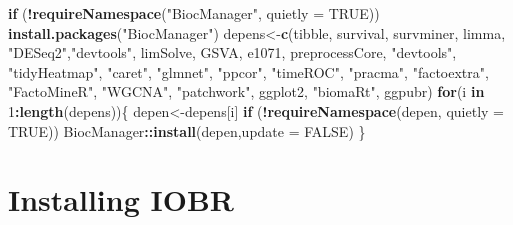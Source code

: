 \documentclass[
  12pt,
]{book}
\newenvironment{Shaded}{\begin{snugshade}}{\end{snugshade}}
\newcommand{\AttributeTok}[1]{\textcolor[rgb]{0.13,0.29,0.53}{#1}}
\newcommand{\ConstantTok}[1]{\textcolor[rgb]{0.56,0.35,0.01}{#1}}
\newcommand{\ControlFlowTok}[1]{\textcolor[rgb]{0.13,0.29,0.53}{\textbf{#1}}}
\newcommand{\DecValTok}[1]{\textcolor[rgb]{0.00,0.00,0.81}{#1}}
\newcommand{\FunctionTok}[1]{\textcolor[rgb]{0.13,0.29,0.53}{\textbf{#1}}}
\newcommand{\NormalTok}[1]{#1}
\newcommand{\OtherTok}[1]{\textcolor[rgb]{0.56,0.35,0.01}{#1}}
\newcommand{\SpecialCharTok}[1]{\textcolor[rgb]{0.81,0.36,0.00}{\textbf{#1}}}
\newcommand{\StringTok}[1]{\textcolor[rgb]{0.31,0.60,0.02}{#1}}
\theoremstyle{definition}
\theoremstyle{definition}
\theoremstyle{definition}
\theoremstyle{definition}
\theoremstyle{remark}
\begin{document}
\begin{Shaded}
\begin{Highlighting}[]
\ControlFlowTok{if}\NormalTok{ (}\SpecialCharTok{!}\FunctionTok{requireNamespace}\NormalTok{(}\StringTok{"BiocManager"}\NormalTok{, }\AttributeTok{quietly =} \ConstantTok{TRUE}\NormalTok{)) }\FunctionTok{install.packages}\NormalTok{(}\StringTok{"BiocManager"}\NormalTok{)}
\NormalTok{depens}\OtherTok{\textless{}{-}}\FunctionTok{c}\NormalTok{(}\StringTok{\textquotesingle{}tibble\textquotesingle{}}\NormalTok{, }\StringTok{\textquotesingle{}survival\textquotesingle{}}\NormalTok{, }\StringTok{\textquotesingle{}survminer\textquotesingle{}}\NormalTok{, }\StringTok{\textquotesingle{}limma\textquotesingle{}}\NormalTok{, }\StringTok{"DESeq2"}\NormalTok{,}\StringTok{"devtools"}\NormalTok{, }\StringTok{\textquotesingle{}limSolve\textquotesingle{}}\NormalTok{, }\StringTok{\textquotesingle{}GSVA\textquotesingle{}}\NormalTok{, }\StringTok{\textquotesingle{}e1071\textquotesingle{}}\NormalTok{, }\StringTok{\textquotesingle{}preprocessCore\textquotesingle{}}\NormalTok{, }
          \StringTok{"devtools"}\NormalTok{, }\StringTok{"tidyHeatmap"}\NormalTok{, }\StringTok{"caret"}\NormalTok{, }\StringTok{"glmnet"}\NormalTok{, }\StringTok{"ppcor"}\NormalTok{,  }\StringTok{"timeROC"}\NormalTok{, }\StringTok{"pracma"}\NormalTok{, }\StringTok{"factoextra"}\NormalTok{, }
          \StringTok{"FactoMineR"}\NormalTok{, }\StringTok{"WGCNA"}\NormalTok{, }\StringTok{"patchwork"}\NormalTok{, }\StringTok{\textquotesingle{}ggplot2\textquotesingle{}}\NormalTok{, }\StringTok{"biomaRt"}\NormalTok{, }\StringTok{\textquotesingle{}ggpubr\textquotesingle{}}\NormalTok{)}
\ControlFlowTok{for}\NormalTok{(i }\ControlFlowTok{in} \DecValTok{1}\SpecialCharTok{:}\FunctionTok{length}\NormalTok{(depens))\{}
\NormalTok{  depen}\OtherTok{\textless{}{-}}\NormalTok{depens[i]}
  \ControlFlowTok{if}\NormalTok{ (}\SpecialCharTok{!}\FunctionTok{requireNamespace}\NormalTok{(depen, }\AttributeTok{quietly =} \ConstantTok{TRUE}\NormalTok{))  BiocManager}\SpecialCharTok{::}\FunctionTok{install}\NormalTok{(depen,}\AttributeTok{update =} \ConstantTok{FALSE}\NormalTok{)}
\NormalTok{\}}
\end{Highlighting}
\end{Shaded}

\hypertarget{installing-iobr}{%
\section{Installing IOBR}\label{installing-iobr}}
\end{document}
